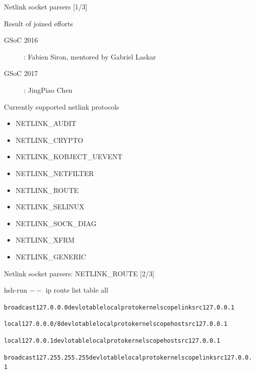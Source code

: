 \documentclass[unicode]{beamer}
\begin{document}
\begin{frame}{Netlink socket parsers \hfill [1/3]}
\begin{block}{Result of joined efforts}
\begin{description}
\item[GSoC 2016]: Fabien Siron, mentored by Gabriel Laskar
\item[GSoC 2017]: JingPiao Chen
\end{description}
\end{block}
\begin{block}{Currently supported netlink protocols}
\begin{itemize}
\item NETLINK\_AUDIT
\item NETLINK\_CRYPTO
\item NETLINK\_KOBJECT\_UEVENT
\item NETLINK\_NETFILTER
\item NETLINK\_ROUTE
\item NETLINK\_SELINUX
\item NETLINK\_SOCK\_DIAG
\item NETLINK\_XFRM
\item NETLINK\_GENERIC
\end{itemize}
\end{block}
\end{frame}

\begin{frame}{Netlink socket parsers: NETLINK\_ROUTE \hfill [2/3]}
\begin{block}{hsh-run $--$ ip route list table all}
\begin{alltt}
broadcast 127.0.0.0 dev lo table local proto kernel scope link src 127.0.0.1

local 127.0.0.0/8 dev lo table local proto kernel scope host src 127.0.0.1

local 127.0.0.1 dev lo table local proto kernel scope host src 127.0.0.1

broadcast 127.255.255.255 dev lo table local proto kernel scope link src 127.0.0.1
\end{alltt}
\end{block}
\end{frame}
\end{document}
